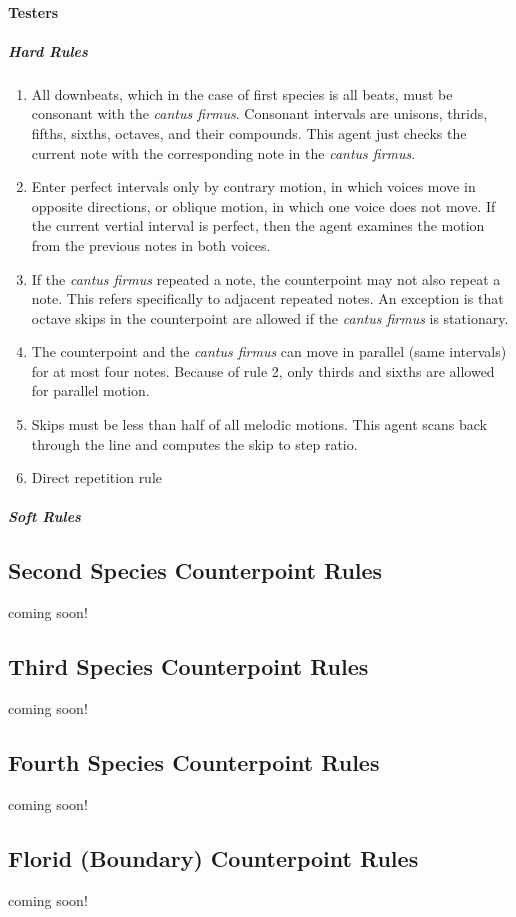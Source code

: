 \paragraph{Testers}
\subparagraph{Hard Rules}
	\begin{enumerate}
		\item All downbeats, which in the case of first species is all beats, must be consonant with the \emph{cantus firmus}. 
					Consonant intervals are unisons, thrids, fifths, sixths, octaves, and their compounds.
					This agent just checks the current note with the corresponding note in the \emph{cantus firmus}.

		\item Enter perfect intervals only by contrary motion, in which voices move in opposite directions, or oblique motion, in which one voice does not move.
					If the current vertial interval is perfect, then the agent examines the motion from the previous notes in both voices.

		\item If the \emph{cantus firmus} repeated a note, the counterpoint may not also repeat a note. This refers specifically to adjacent repeated notes.
					An exception is that octave skips in the counterpoint are allowed if the \emph{cantus firmus} is stationary.

		\item The counterpoint and the \emph{cantus firmus} can move in parallel (same intervals) for at most four notes. Because of rule 2, only thirds and sixths are allowed for parallel motion.

		\item Skips must be less than half of all melodic motions.
					This agent scans back through the line and computes the skip to step ratio.

		\item Direct repetition rule
	\end{enumerate}
\subparagraph{Soft Rules}

\subsection{Second Species Counterpoint Rules}
coming soon!
\subsection{Third Species Counterpoint Rules}
coming soon!
\subsection{Fourth Species Counterpoint Rules}
coming soon!
\subsection{Florid (Boundary) Counterpoint Rules}
coming soon!
